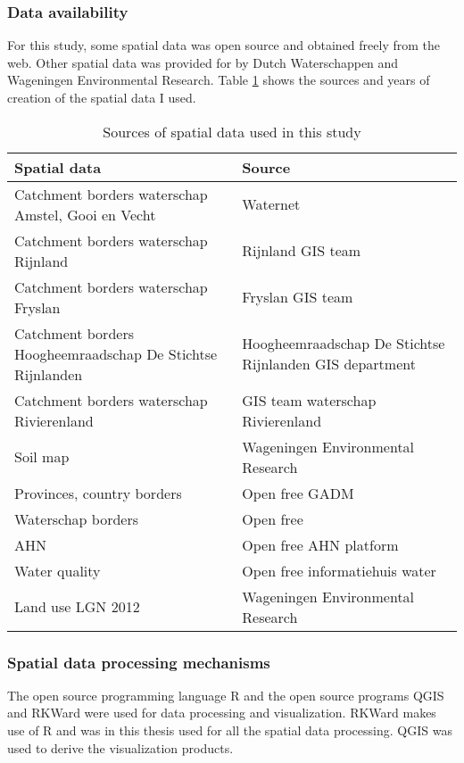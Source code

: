 \documentclass[a4paper,12pt]{scrbook}
\begin{document}
\subsubsection{Data availability}
For this study, some spatial data was open source and obtained freely from the web. Other spatial data was provided for by Dutch Waterschappen and Wageningen Environmental Research. Table \ref{tab:spatialdatasources} shows the sources and years of creation of the spatial data I used. 

\begin{table}[htbp]
\caption{Sources of spatial data used in this study}
\begin{center}
\begin{tabular}{|p{7cm}|p{7cm}|}
\hline
\textbf{Spatial data} & \textbf{Source} \\ \hline
Catchment borders waterschap Amstel, Gooi en Vecht & Waternet  \\ \hline
Catchment borders waterschap Rijnland & Rijnland GIS team \\ \hline
Catchment borders waterschap Fryslan & Fryslan GIS team \\ \hline
Catchment borders Hoogheemraadschap De Stichtse Rijnlanden & Hoogheemraadschap De Stichtse Rijnlanden GIS department \\ \hline
Catchment borders waterschap Rivierenland & GIS team waterschap Rivierenland \\ \hline
Soil map & Wageningen Environmental Research \\ \hline
Provinces, country borders & Open free GADM \\ \hline
Waterschap borders & Open free \\ \hline
AHN & Open free AHN platform \\ \hline
Water quality & Open free informatiehuis water \\ \hline
Land use LGN 2012 & Wageningen Environmental Research \\ \hline
\end{tabular}
\end{center}
\label{tab:spatialdatasources}
\end{table}

\subsubsection{Spatial data processing mechanisms}
The open source programming language R and the open source programs \ac{QGIS} and RKWard were used for data processing and visualization. RKWard makes use of R and was in this thesis used for all the spatial data processing. \ac{QGIS} was used to derive the visualization products.
\end{document}
